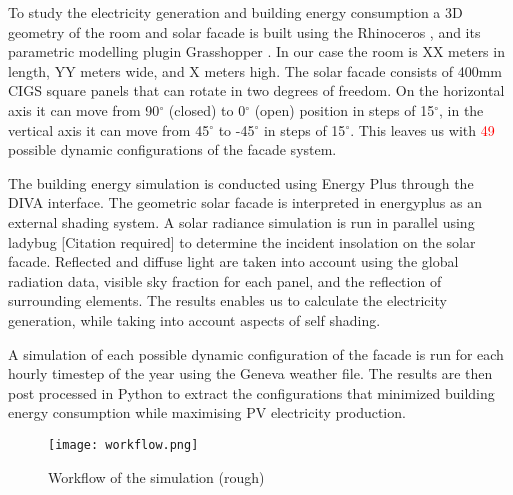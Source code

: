 
To study the electricity generation and building energy consumption a 3D geometry of the room and solar facade is built using the Rhinoceros \cite{Rhino}, and its parametric modelling plugin Grasshopper \cite{grasshopper}. In our case the room is XX meters in length, YY meters wide, and X meters high. The solar facade consists of 400mm CIGS square panels that can rotate in two degrees of freedom. On the horizontal axis it can move from 90$^{\circ}$ (closed) to 0$^{\circ}$ (open) position in steps of 15$^{\circ}$, in the vertical axis it can move from 45$^{\circ}$ to -45$^{\circ}$ in steps of 15$^{\circ}$. This leaves us with \textcolor{red}{49} possible dynamic configurations of the facade system. 

The building energy simulation is conducted using Energy Plus \cite{energyplus} through the DIVA \cite{DIVA} interface. The geometric solar facade is interpreted in energyplus as an external shading system. A solar radiance simulation is run in parallel using ladybug [Citation required] to determine the incident insolation on the solar facade. Reflected and diffuse light are taken into account using the global radiation data, visible sky fraction for each panel, and the reflection of surrounding elements. The results enables us to calculate the electricity generation, while taking into account aspects of self shading. 

A simulation of each possible dynamic configuration of the facade is run for each hourly timestep of the year using the Geneva weather file. The results are then post processed in Python to extract the configurations that minimized building energy consumption while maximising PV electricity production. 

\begin{figure}
\begin{center}
\texttt{[image: workflow.png]}
\caption{Workflow of the simulation (rough)}
\label{fig:workflow}
\end{center}
\end{figure}